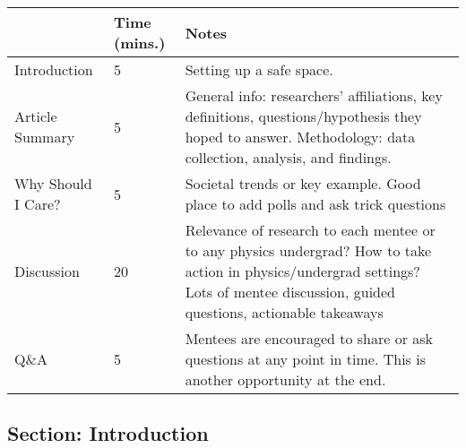 \documentclass[addpoints,12pt]{exam}
\numberwithin{equation}{section}
\begin{document}
	\begin{table}[h!]
	\begin{tabular}{p{4cm}|p{3cm}|p{9cm}}
		& \textbf{Time (mins.) }& \textbf{Notes        }                                                                                                                                                                         \\
		\hline
		Introduction      & 5            & Setting up a safe space.                                                                                                                                                              \\
		\hline
		Article Summary   & 5            & General info: researchers’ affiliations, key definitions, questions/hypothesis they hoped to answer. Methodology: data collection, analysis, and findings.                            \\
		\hline
		Why Should I Care? & 5            & Societal trends or key example. Good place to add polls and ask trick questions                                                                                                       \\
		\hline
		Discussion        & 20           & Relevance of research to each mentee or to any physics undergrad? How to take action in physics/undergrad settings? Lots of mentee discussion, guided questions, actionable takeaways \\
		\hline
		Q\&A              & 5            & Mentees are encouraged to share or ask questions at any point in time. This is another opportunity at the end.                                                                       
		\end{tabular}
	\end{table}

	\subsection{Section: Introduction}
	
\end{document}
